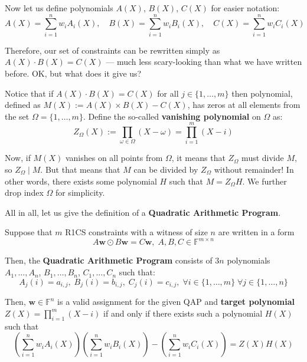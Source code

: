 \documentclass[../lecture-notes-148x210.tex]{subfiles}
\begin{document}
Now let us define polynomials $A(X)$, $B(X)$, $C(X)$ for easier notation: 
\begin{equation*}
    A(X) = \sum_{i = 1}^{n} w_iA_i(X), \quad B(X) = \sum_{i = 1}^{n} w_iB_i(X), \quad C(X) = \sum_{i = 1}^{n} w_iC_i(X)
\end{equation*}

Therefore, our set of constraints can be rewritten simply as $A(X)\cdot B(X) =
C(X)$ --- much less scary-looking than what we have written before. OK, but what
does it give us? 

Notice that if $A(X) \cdot B(X)=C(X)$ for all $j \in \{1,\dots,m\}$ then polynomial, defined as $M(X) := A(X) \times B(X)-C(X)$, has zeros at all elements from the set $\Omega = \{1,\dots,m\}$. Define the so-called \textbf{vanishing polynomial} on $\Omega$ as:
\begin{equation*}
    Z_{\Omega}(X) := \prod_{\omega \in \Omega} (X - \omega) = \prod_{i=1}^m (X - i)
\end{equation*} 

Now, if $M(X)$ vanishes on all points from $\Omega$, it means that $Z_{\Omega}$ must divide $M$, so $Z_{\Omega} \mid M$. But that means
that $M$ can be divided by $Z_{\Omega}$ without remainder! In other words, there exists some polynomial $H$ such that $M=Z_{\Omega}H$. We further drop index $\Omega$ for simplicity. 

All in all, let us give the definition of a \textbf{Quadratic Arithmetic Program}.

\begin{definition}
    Suppose that $m$ R1CS constraints with a witness of size $n$ are written in a form
    \begin{equation*}
        A\mathbf{w} \odot B\mathbf{w} = C\mathbf{w}, \; A,B,C \in \mathbb{F}^{m \times n}
    \end{equation*}

    Then, the \textbf{Quadratic Arithmetic Program} consists of $3n$ polynomials $A_1,\dots,A_n$, $B_1,\dots,B_n$, $C_1,\dots,C_n$ such that:
    \begin{equation*}
        A_j(i) = a_{i,j}, \; B_j(i) = b_{i,j}, \; C_j(i) = c_{i,j}, \; \forall i \in \{1,\dots,m\} \; \forall j \in \{1,\dots,n\}
    \end{equation*}

    Then, $\mathbf{w} \in \mathbb{F}^n$ is a valid assignment for the given QAP and \textbf{target polynomial} $Z(X) = \prod_{i=1}^m (X-i)$ if and only if there exists such a polynomial $H(X)$ such that
    \begin{equation*}
        \left( \sum_{i = 1}^{n} w_iA_i(X) \right)\left( \sum_{i = 1}^{n} w_iB_i(X) \right) - \left( \sum_{i = 1}^{n} w_iC_i(X) \right) = Z(X)H(X)
    \end{equation*}
\end{definition}
\end{document}

